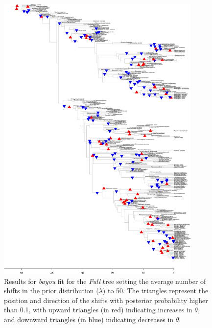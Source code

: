 \newpage

\begin{figure}[H]
\includegraphics[width=0.9\textwidth]{img/plots-full-wZBL-k50-1.pdf}
\caption{Results for \textit{bayou} fit for the \textit{Full} tree setting the average number of shifts in the prior distribution ($\lambda$) to 50. The triangles represent the position and direction of the shifts with posterior probability higher than 0.1, with upward triangles (in red) indicating increases in $\theta$, and downward triangles (in blue) indicating decreases in $\theta$.}
\label{fig:full-k50}
\end{figure}

\newpage

